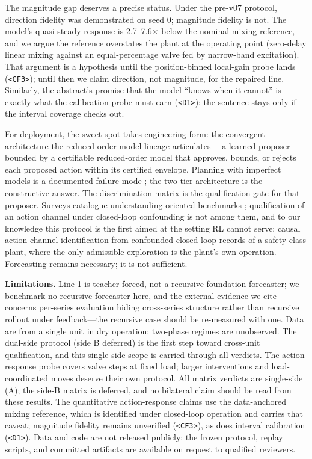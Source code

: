 \documentclass{article}
\begin{document}
The magnitude gap deserves a precise status. Under the pre-v07 protocol, direction
fidelity was demonstrated on seed 0; magnitude fidelity is not. The model's
quasi-steady response is
2.7--7.6$\times$ below the nominal mixing reference, and we argue the reference
overstates the plant at the operating point (zero-delay linear mixing against an
equal-percentage valve fed by narrow-band excitation). That argument is a hypothesis
until the position-binned local-gain probe lands (\texttt{<CF3>}); until then we
claim direction, not magnitude, for the repaired line. Similarly, the abstract's
promise that the model ``knows when it cannot'' is exactly what the calibration
probe must earn (\texttt{<D1>}): the sentence stays only if the interval coverage
checks out.

For deployment, the sweet spot takes engineering form: the convergent architecture
the reduced-order-model lineage articulates \cite{ghosh2026rom, benner2015survey,
sha2001simplicity}---a learned proposer bounded by a certifiable reduced-order model
that approves, bounds, or rejects each proposed action within its certified
envelope. Planning with imperfect models is a documented failure mode
\cite{jafferjee2021hallucinating, wang2022doublecheck}; the two-tier architecture is
the constructive answer. The discrimination matrix is the qualification gate for that
proposer. Surveys catalogue understanding-oriented benchmarks
\cite{ding2024understanding}; qualification of an action channel under closed-loop
confounding is not among them, and to our knowledge this protocol is the first aimed
at the setting RL cannot serve: causal action-channel identification from confounded
closed-loop records of a safety-class plant, where the only admissible exploration is
the plant's own operation. Forecasting remains necessary; it is not sufficient.

\textbf{Limitations.} Line 1 is teacher-forced, not a recursive foundation forecaster;
we benchmark no recursive forecaster here, and the external evidence we cite concerns
per-series evaluation hiding cross-series structure \cite{wan2026forecast} rather
than recursive rollout under feedback---the recursive case should be re-measured with
one. Data are from a single
unit in dry operation; two-phase regimes are unobserved. The dual-side protocol
(side B deferred) is the first step toward cross-unit qualification, and this
single-side scope is carried through all verdicts. The action-response probe
covers valve steps at fixed load; larger interventions and load-coordinated moves
deserve their own protocol. All matrix verdicts are single-side (A); the side-B
matrix is deferred, and no bilateral claim should be read from these results. The
quantitative action-response claims use the data-anchored mixing reference, which is
identified under closed-loop operation and carries that caveat; magnitude fidelity
remains unverified (\texttt{<CF3>}), as does interval calibration (\texttt{<D1>}).
Data and code are not released publicly; the frozen protocol, replay scripts, and
committed artifacts are available on request to qualified reviewers.



\end{document}
